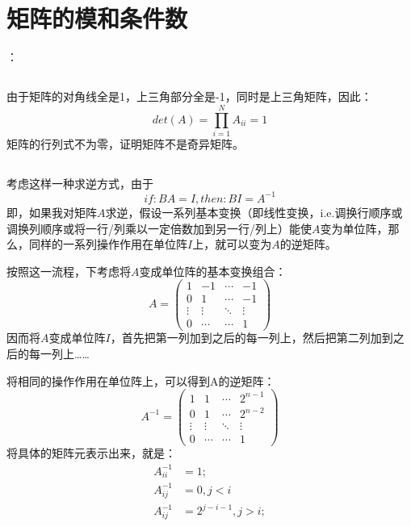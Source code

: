 \documentclass{ctexart}
\begin{document}
    \section{矩阵的模和条件数}：
    \subsection{}
    由于矩阵的对角线全是1，上三角部分全是-1，同时是上三角矩阵，因此：
    $$det(A)=\prod_{i=1}^{N}A_{ii}=1$$
    矩阵的行列式不为零，证明矩阵不是奇异矩阵。
    \subsection{}
    考虑这样一种求逆方式，由于
    $$if:BA=I,then:BI=A^{-1}$$
    即，如果我对矩阵$A$求逆，假设一系列基本变换（即线性变换，i.e.调换行顺序或调换列顺序或将一行/列乘以一定倍数加到另一行/列上）能使$A$变为单位阵，那么，同样的一系列操作作用在单位阵$I$上，就可以变为$A$的逆矩阵。
    \par
    按照这一流程，下考虑将$A$变成单位阵的基本变换组合：
    $$
        A=
        \left(
            \begin{matrix}
                1&-1&\cdots&-1\\
                0&1&\cdots&-1\\
                \vdots&\vdots&\ddots&\vdots\\
                0&\cdots&\cdots&1
            \end{matrix}
        \right)
    $$
    因而将$A$变成单位阵$I$，首先把第一列加到之后的每一列上，然后把第二列加到之后的每一列上……
    \par
    将相同的操作作用在单位阵上，可以得到A的逆矩阵：
    $$
        A^{-1}=
        \left(
            \begin{matrix}
                1&1&\cdots&2^{n-1}\\
                0&1&\cdots&2^{n-2}\\
                \vdots&\vdots&\ddots&\vdots\\
                0&\cdots&\cdots&1
            \end{matrix}
        \right)
    $$
    将具体的矩阵元表示出来，就是：
    \begin{align*}
        A^{-1}_{ii}&=1;\\
        A^{-1}_{ij}&=0,j<i\\
        A^{-1}_{ij}&=2^{j-i-1},j>i;
    \end{align*}
\end{document}
